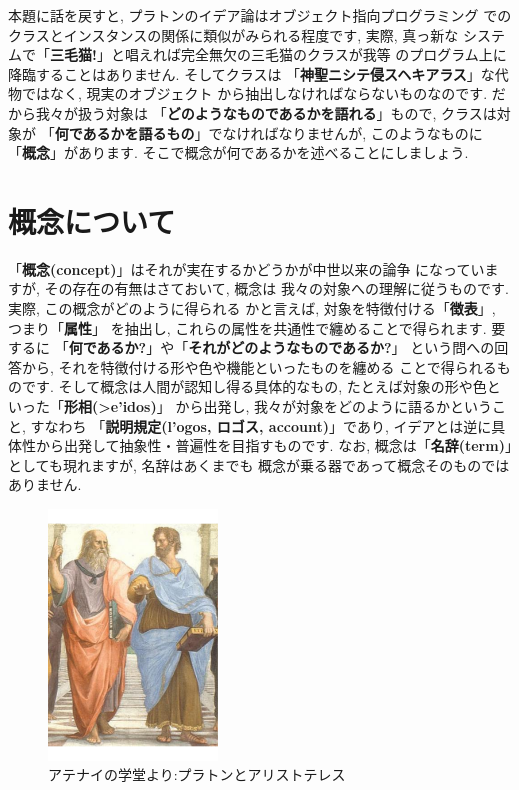 \documentclass[b5j,8pt,twocolumn]{ltjsarticle}
\newcommand{\textgreek}[1]{\begingroup\fontencoding{LGR}\selectfont#1\endgroup}
\begin{document}
本題に話を戻すと, プラトンのイデア論はオブジェクト指向プログラミング
でのクラスとインスタンスの関係に類似がみられる程度です, 実際, 真っ新な
システムで「\textbf{三毛猫!}」と唱えれば完全無欠の三毛猫のクラスが我等
のプログラム上に降臨することはありません. そしてクラスは
「\textbf{神聖ニシテ侵スヘキアラス}」な代物ではなく, 現実のオブジェクト
から抽出しなければならないものなのです. だから我々が扱う対象は
「\textbf{どのようなものであるかを語れる}」もので, クラスは対象が
「\textbf{何であるかを語るもの}」でなければなりませんが, このようなものに
「\textbf{概念}」があります. そこで概念が何であるかを述べることにしましょう.


\section{概念について}

「\textbf{概念(concept)}」はそれが実在するかどうかが中世以来の論争
\cite{普遍論争}になっていますが, その存在の有無はさておいて, 概念は
我々の対象への理解に従うものです. 実際, この概念がどのように得られる
かと言えば, 対象を特徴付ける「\textbf{徴表}」, つまり「\textbf{属性}」
を抽出し, これらの属性を共通性で纏めることで得られます. 要するに
「\textbf{何であるか?}」や「\textbf{それがどのようなものであるか?}」
という問への回答から, それを特徴付ける形や色や機能といったものを纏める
ことで得られるものです. そして概念は人間が認知し得る具体的なもの,
 たとえば対象の形や色といった「\textbf{形相(\textgreek{>e'idos})}」
から出発し, 我々が対象をどのように語るかということ, すなわち
「\textbf{説明規定(\textgreek{l'ogos}, ロゴス, account)}」であり,
 イデアとは逆に具体性から出発して抽象性・普遍性を目指すものです. なお,
 概念は「\textbf{名辞(term)}」としても現れますが, 名辞はあくまでも
概念が乗る器であって概念そのものではありません.
\newline

\begin{figure}
\includegraphics[width=4.5cm]{Plato_and_Aristotle_in_The_School_of_Athens,_by_italian_Rafael.pdf}
\caption{アテナイの学堂より:プラトンとアリストテレス}
\label{fig:Plato-Aristotle}
\end{figure}
\end{document}
